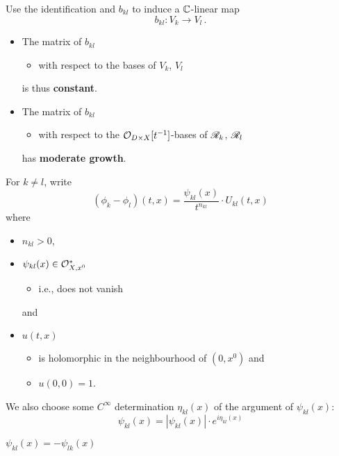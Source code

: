 Use the identification and $b_{kl}$ to induce a $\mathbb{C}$-linear map
\[
  b_{kl}:V_k\to V_l \,.
\]
\begin{rem}
  \begin{itemize}
    \item The matrix of $b_{kl}$
      \begin{itemize}
        \item with respect to the bases of $V_k$, $V_l$
      \end{itemize}
      is thus \textbf{constant}.
    \item The matrix of $b_{kl}$
      \begin{itemize}
        \item with respect to the $\mathcal{O}_{D\times X}[t^{-1}]$-bases of $\mathscr{R}_k$,
          $\mathscr{R}_l$
      \end{itemize}
      has \textbf{moderate growth}.
  \end{itemize}
\end{rem}
For $k\neq l$, write
\[
  (\phi_k-\phi_l)(t,x)=\frac{\psi_{kl}(x)}{t^{n_{kl}}}\cdot U_{kl}(t,x)
\]
where
\begin{itemize}
  \item $n_{kl}>0$,
  \item $\psi_{kl}(x)\in\mathcal{O}_{X,x^0}^*$ 
    \begin{itemize}
      \item i.e., does not vanish
    \end{itemize}
    and
  \item $u(t,x)$
    \begin{itemize}
      \item is holomorphic in the neighbourhood of $(0,x^0)$ and
      \item $u(0,0)=1$.
    \end{itemize}
\end{itemize}
We also choose some $C^\infty$ determination $\eta_{kl}(x)$ of the argument of
$\psi_{kl}(x)$:
\[
  \psi_{kl}(x)=|\psi_{kl}(x)|\cdot e^{i\eta_{kl}(x)}
\]
\begin{rem}
  $\psi_{kl}(x)=-\psi_{lk}(x)$
\end{rem}
